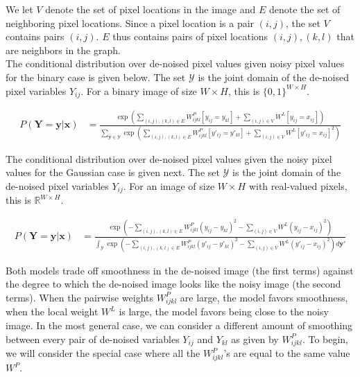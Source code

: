 \documentclass[11pt]{article}
\newcommand{\mbf}[1]{{\mathbf{#1}}}
\begin{document}
We let $V$ denote the set of pixel locations in the image and $E$ denote the set of neighboring pixel locations. Since a pixel location is a pair $(i,j)$, the set $V$ contains pairs $(i,j)$. $E$ thus contains pairs of pixel locations $(i,j),(k,l)$ that are neighbors in the graph. \\

The conditional distribution over de-noised pixel values given noisy pixel values for the binary case is given below. The set $\mathcal{Y}$ is the joint domain of the de-noised pixel variables $Y_{ij}$. For a binary image of size $W\times H$, this is $\{0,1\}^{W\times H}$.

\begin{align}
P(\mbf{Y}=\mbf{y}|\mbf{x}) &= \frac{\displaystyle \exp\left(\sum_{(i,j),(k,l)\in E} W^P_{ijkl}[y_{ij}=y_{kl}] +  \sum_{(i,j) \in V} W^L[y_{ij}=x_{ij}] \right)}
{\displaystyle\sum_{\mbf{y}\in\mathcal{Y}}\exp\left(\sum_{(i,j),(k,l)\in E} W^P_{ijkl}[y'_{ij}=y'_{kl}] +  \sum_{(i,j) \in V} W^L[y'_{ij}=x_{ij}]^2\right) }
\end{align}

The conditional distribution over de-noised pixel values given the noisy pixel values for the Gaussian case is given next. The set $\mathcal{Y}$ is the joint domain of the de-noised pixel variables $Y_{ij}$. For an image of size $W\times H$ with real-valued pixels, this is $\mathbb{R}^{W\times H}$.

\begin{align}
P(\mbf{Y}=\mbf{y}|\mbf{x}) &= \frac{\displaystyle \exp\left(-\sum_{(i,j),(k,l)\in E} W^P_{ijkl}(y_{ij}-y_{kl})^2 -  \sum_{(i,j) \in V} W^L(y_{ij}-x_{ij})^2 \right)}
{\displaystyle\int_{\mathcal{Y}}\exp\left(-\sum_{(i,j),(k,l)\in E} W^P_{ijkl}(y'_{ij}-y'_{kl})^2 -  \sum_{(i,j) \in V} W^L(y'_{ij}-x_{ij})^2\right)d\mbf{y}' }
\end{align}

Both models trade off smoothness in the de-noised image (the first terms) against the degree to which the de-noised image looks like the noisy image (the second terms). When the pairwise weights $W^P_{ijkl}$ are large, the model favors smoothness, when the local weight $W^L$ is large, the model favors being close to the noisy image. In the most general case, we can consider a different amount of smoothing between every pair of de-noised variables $Y_{ij}$ and $Y_{kl}$ as given by $W^P_{ijkl}$. To begin, we will consider the special case where all the $W^P_{ijkl}$'s are equal to the same value $W^P$.\\
\end{document}
